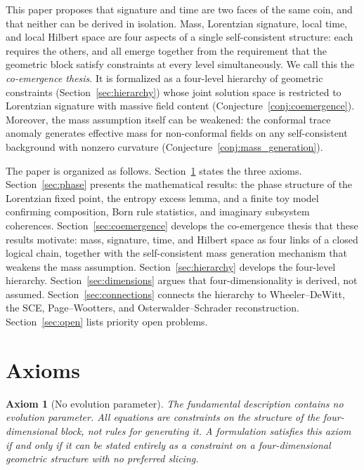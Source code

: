 \documentclass[12pt,a4paper]{article}
\newtheorem{axiom}{Axiom}
\theoremstyle{definition}
\theoremstyle{remark}
\begin{document}
This paper proposes that signature and time are two faces of the same
coin, and that neither can be derived in isolation. Mass, Lorentzian
signature, local time, and local Hilbert space are four aspects of a
single self-consistent structure: each requires the others, and all
emerge together from the requirement that the geometric block satisfy
constraints at every level simultaneously. We call this the
\emph{co-emergence thesis}. It is formalized as a four-level hierarchy
of geometric constraints (Section~\ref{sec:hierarchy}) whose joint
solution space is restricted to Lorentzian signature with massive field
content (Conjecture~\ref{conj:coemergence}). Moreover, the mass
assumption itself can be weakened: the conformal trace anomaly generates
effective mass for non-conformal fields on any self-consistent
background with nonzero curvature
(Conjecture~\ref{conj:mass_generation}).

The paper is organized as follows. Section~\ref{sec:axioms} states the
three axioms. Section~\ref{sec:phase} presents the mathematical results:
the phase structure of the Lorentzian fixed point, the entropy excess
lemma, and a finite toy model confirming composition, Born rule
statistics, and imaginary subsystem coherences.
Section~\ref{sec:coemergence} develops the
co-emergence thesis that these results motivate: mass, signature, time,
and Hilbert space as four links of a closed logical chain, together with
the self-consistent mass generation mechanism that weakens the mass
assumption. Section~\ref{sec:hierarchy} develops the four-level hierarchy.
Section~\ref{sec:dimensions} argues that four-dimensionality is derived,
not assumed. Section~\ref{sec:connections} connects the hierarchy to
Wheeler--DeWitt, the SCE, Page--Wootters, and Osterwalder--Schrader
reconstruction. Section~\ref{sec:open} lists priority open problems.

\section{Axioms}
\label{sec:axioms}

\begin{axiom}[No evolution parameter]
\label{ax:timeless}
The fundamental description contains no evolution parameter. All equations
are constraints on the structure of the four-dimensional block, not rules for
generating it. A formulation satisfies this axiom if and only if it can be
stated entirely as a constraint on a four-dimensional geometric structure with
no preferred slicing.
\end{axiom}
\end{document}
